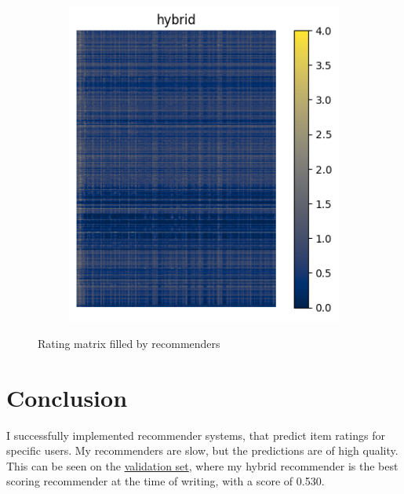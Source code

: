 \documentclass[sigconf]{acmart}
\begin{document}
\begin{figure}[!htb]
\begin{subfigure}{0.2\textwidth}
		\includegraphics[scale=0.4]{matrix_hybrid.png}
	\end{subfigure}
	\caption{Rating matrix filled by recommenders}
	\label{fig:results:full_matrices}
\end{figure}
\FloatBarrier


\section{Conclusion}
I successfully implemented recommender systems, that predict item ratings for specific users.
My recommenders are slow, but the predictions are of high quality.
This can be seen on the \href{http://csujena.pythonanywhere.com/}{validation set}, where my hybrid recommender is the best scoring recommender at the time of writing, with a score of 0.530.

\typeout{}


\end{document}

